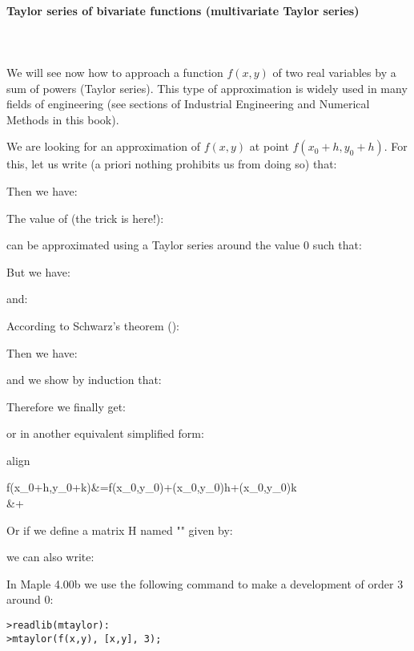 	\pagebreak
	\paragraph{Taylor series of bivariate functions (multivariate Taylor series)}\mbox{}\\\\
	We will see now how to approach a function $f (x, y)$ of two real variables by a sum of powers (Taylor series). This type of approximation is widely used in many fields of engineering (see sections of Industrial Engineering and Numerical Methods in this book).
	
	We are looking for an approximation of $f (x, y)$ at point $f(x_0+h,y_0+h)$. For this, let us write (a priori nothing prohibits us from doing so) that:
	
	Then we have:
	
	The value of (the trick is here!):
	
	can be approximated using a Taylor series around the value $0$ such that:
	
	But we have:
	
	and:
	
	According to Schwarz's theorem ():
	
	Then we have:
	
	and we show by induction that:
	
	Therefore we finally get:
	
	or in another equivalent simplified form:
	\begin{empheq}[box=\fbox]{align}
		\begin{split}
  		f(x_0+h,y_0+k)&=f(x_0,y_0)+(x_0,y_0)h+(x_0,y_0)k\\
		&+
		\end{split}
	\end{empheq}
	Or if we define a matrix H named "" given by:
	
	we can also write:
	
	In Maple 4.00b we use the following command to make a development of order $3$ around $0$:
	
	\texttt{>readlib(mtaylor):\\
	>mtaylor(f(x,y), [x,y], 3);}
	

